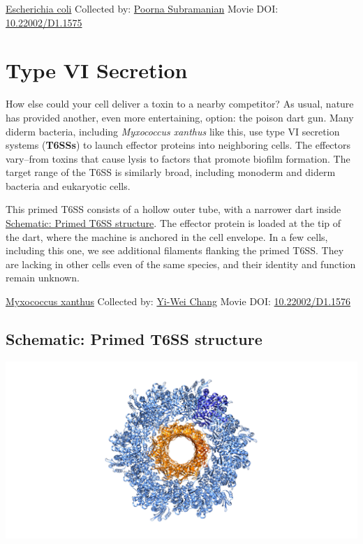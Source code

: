 \documentclass[]{tufte-book}
\begin{document}
\hypertarget{htmlwidget-fc11224115f7f4fc40a3}{}

\label{fig:9-5}\protect\hyperlink{tree}{Escherichia coli} Collected by: \protect\hyperlink{poorna_subramanian}{Poorna Subramanian} Movie DOI: \href{https://doi.org/10.22002/D1.1575}{10.22002/D1.1575}

\hypertarget{type-vi-secretion}{%
\section{Type VI Secretion}\label{type-vi-secretion}}

How else could your cell deliver a toxin to a nearby competitor? As usual, nature has provided another, even more entertaining, option: the poison dart gun. Many diderm bacteria, including \emph{Myxococcus xanthus} like this, use type VI secretion systems (\textbf{T6SSs}) to launch effector proteins into neighboring cells. The effectors vary--from toxins that cause lysis to factors that promote biofilm formation. The target range of the T6SS is similarly broad, including monoderm and diderm bacteria and eukaryotic cells.

This primed T6SS consists of a hollow outer tube, with a narrower dart inside \protect\hyperlink{Primed_T6SS_structure}{Schematic: Primed T6SS structure}. The effector protein is loaded at the tip of the dart, where the machine is anchored in the cell envelope. In a few cells, including this one, we see additional filaments flanking the primed T6SS. They are lacking in other cells even of the same species, and their identity and function remain unknown.



\hypertarget{htmlwidget-06d1713d96b8cf776962}{}

\label{fig:9-6}\protect\hyperlink{tree}{Myxococcus xanthus} Collected by: \protect\hyperlink{yi-wei_chang}{Yi-Wei Chang} Movie DOI: \href{https://doi.org/10.22002/D1.1576}{10.22002/D1.1576}

\hypertarget{Primed_T6SS_structure}{%
\subsection*{Schematic: Primed T6SS structure}\label{Primed_T6SS_structure}}

\includegraphics{img/schematics/9_6_1}
\end{document}
